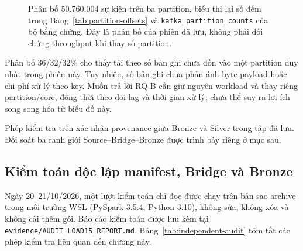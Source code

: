 \begin{figure}[H]
\centering
\begingroup
{}
\endgroup
\caption[Phân bố sự kiện theo Kafka partition]{Phân bố 50.760.004 sự kiện trên ba
partition, biểu thị lại số đếm trong Bảng~\ref{tab:partition-offsets} và
\texttt{kafka\_partition\_counts} của bộ bằng chứng. Đây là phân bố của phiên
đã lưu, không phải đối chứng throughput khi thay số partition.}
\label{fig:partition-distribution}
\end{figure}

Phân bố 36/32/32\% cho thấy tải theo số bản ghi chưa dồn vào một partition
duy nhất trong phiên này. Tuy nhiên, số bản ghi chưa phản ánh byte payload
hoặc chi phí xử lý theo key. Muốn trả lời RQ-B cần giữ nguyên workload và
thay riêng partition/core, đồng thời theo dõi lag và thời gian xử lý;
chưa thể suy ra lợi ích song song hóa từ biểu đồ này.


Phép kiểm tra trên xác nhận provenance giữa Bronze và Silver trong tập đã lưu. Đối soát ba ranh giới Source--Bridge--Bronze được trình bày riêng ở mục sau.

\subsection{Kiểm toán độc lập manifest, Bridge và Bronze}
\label{subsec:independent-audit}
Ngày 20--21/10/2026, một lượt kiểm toán chỉ đọc được chạy trên bản sao archive trong môi trường WSL (PySpark 3.5.4, Python 3.10), không sửa, không xóa và không cài thêm gói. Báo cáo kiểm toán được lưu kèm tại \texttt{evidence/AUDIT\_LOAD15\_REPORT.md}. Bảng~\ref{tab:independent-audit} tóm tắt các phép kiểm tra liên quan đến chương này.

